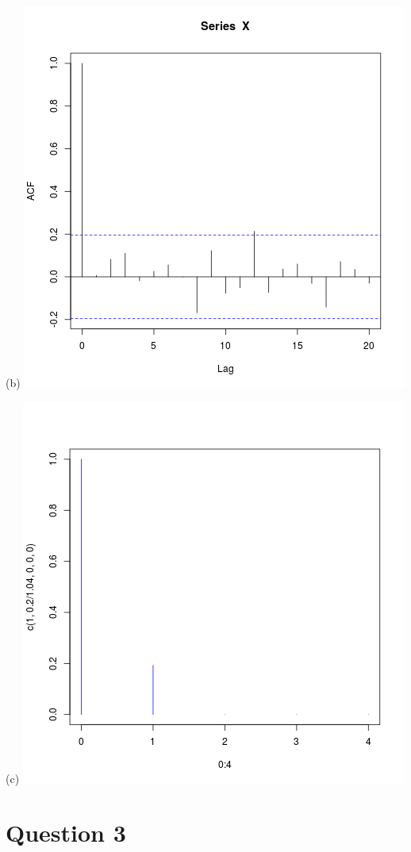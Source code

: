 \documentclass{article}
\begin{document}
(b)
\includegraphics{"plot2_b"}
\pagebreak

(c)
\includegraphics{"plot2_c"}
\pagebreak


\section{Question 3}
\end{document}
